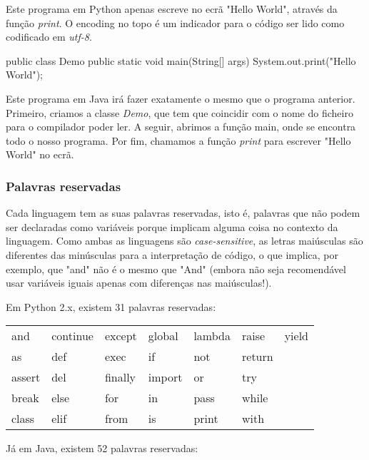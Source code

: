 \documentclass[11pt,openright,twoside]{report}
\begin{document}
Este programa em Python apenas escreve no ecrã "Hello World", através da função \textit{print}. O encoding no topo é um indicador para o código ser lido como codificado em \textit{utf-8}.

\smallskip
\begin{Java}
public class Demo{
	public static void main(String[] args){
		System.out.print("Hello World");
	}
}
\end{Java}
\smallskip

Este programa em Java irá fazer exatamente o mesmo que o programa anterior. Primeiro, criamos a classe \textit{Demo}, que tem que coincidir com o nome do ficheiro para o compilador poder ler. A seguir, abrimos a função main, onde se encontra todo o nosso programa. Por fim, chamamos a função \textit{print} para escrever "Hello World" no ecrã.
\medskip

\subsubsection{Palavras reservadas}
Cada linguagem tem as suas palavras reservadas, isto é, palavras que não podem ser declaradas como variáveis porque implicam alguma coisa no contexto da linguagem. Como ambas as linguagens são \textit{case-sensitive}, as letras maiúsculas são diferentes das minúsculas para a interpretação de código, o que implica, por exemplo, que "and" não é o mesmo que "And" (embora não seja recomendável usar variáveis iguais apenas com diferenças nas maiúsculas!).
\smallskip

Em Python 2.x, existem 31 palavras reservadas:

\begin{table}[h]
\begin{tabular}{lllllll}
and					    & continue    	& except    & global    & lambda   & raise & yield\\
as                  	& def    	  	& exec 		& if 	& not    & return    \\
assert                  & del   		& finally     & import  & or  & try  \\
break                   & else   		& for    	& in     	& pass & while  \\
class                	& elif 			& from  	& is 		& print & with
\end{tabular}
\end{table}
\smallskip

Já em Java, existem 52 palavras reservadas:
\end{document}
